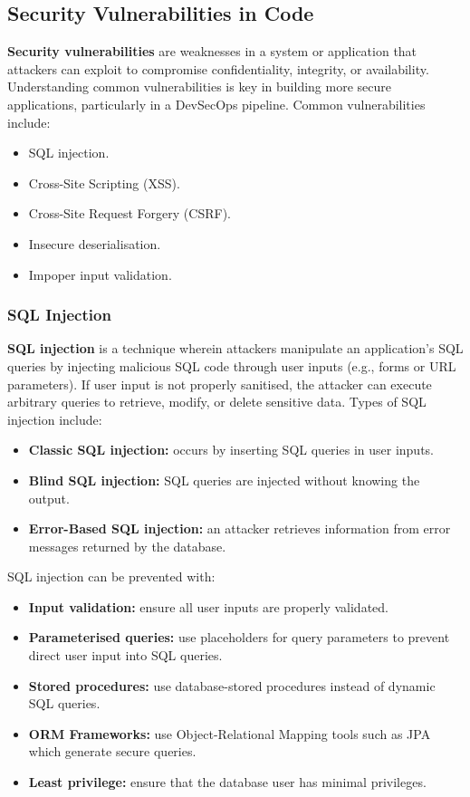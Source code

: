 \documentclass[a4paper,11pt]{article}
\begin{document}
\subsection{Security Vulnerabilities in Code}
\textbf{Security vulnerabilities} are weaknesses in a system or application that attackers can exploit to compromise confidentiality, integrity, or availability.
Understanding common vulnerabilities is key in building more secure applications, particularly in a DevSecOps pipeline.
Common vulnerabilities include:
\begin{itemize}
    \item   SQL injection.
    \item   Cross-Site Scripting (XSS).
    \item   Cross-Site Request Forgery (CSRF).
    \item   Insecure deserialisation.
    \item   Impoper input validation.
\end{itemize}

\subsubsection{SQL Injection}
\textbf{SQL injection} is a technique wherein attackers manipulate an application's SQL queries by injecting malicious SQL code through user inputs (e.g., forms or URL parameters).
If user input is not properly sanitised, the attacker can execute arbitrary queries to retrieve, modify, or delete sensitive data.
Types of SQL injection include:
\begin{itemize}
    \item   \textbf{Classic SQL injection:} occurs by inserting SQL queries in user inputs.
    \item   \textbf{Blind SQL injection:} SQL queries are injected without knowing the output.
    \item   \textbf{Error-Based SQL injection:} an attacker retrieves information from error messages returned by the database.
\end{itemize}

SQL injection can be prevented with:
\begin{itemize}
    \item   \textbf{Input validation:} ensure all user inputs are properly validated.
    \item   \textbf{Parameterised queries:} use placeholders for query parameters to prevent direct user input into SQL queries.
    \item   \textbf{Stored procedures:} use database-stored procedures instead of dynamic SQL queries.
    \item   \textbf{ORM Frameworks:} use Object-Relational Mapping tools such as JPA which generate secure queries.
    \item   \textbf{Least privilege:} ensure that the database user has minimal privileges.
\end{itemize}
\end{document}
